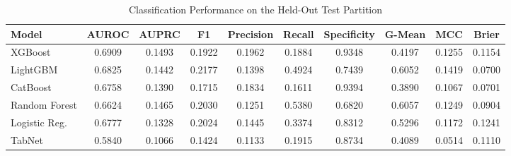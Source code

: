\begin{table}
\centering
\caption{Classification Performance on the Held-Out Test Partition}
\label{tab:results}
\begin{tabular}{lccccccccc}
\toprule
Model & AUROC & AUPRC & F1 & Precision & Recall & Specificity & G-Mean & MCC & Brier \\
\midrule
XGBoost & 0.6909 & 0.1493 & 0.1922 & 0.1962 & 0.1884 & 0.9348 & 0.4197 & 0.1255 & 0.1154 \\
LightGBM & 0.6825 & 0.1442 & 0.2177 & 0.1398 & 0.4924 & 0.7439 & 0.6052 & 0.1419 & 0.0700 \\
CatBoost & 0.6758 & 0.1390 & 0.1715 & 0.1834 & 0.1611 & 0.9394 & 0.3890 & 0.1067 & 0.0701 \\
Random Forest & 0.6624 & 0.1465 & 0.2030 & 0.1251 & 0.5380 & 0.6820 & 0.6057 & 0.1249 & 0.0904 \\
Logistic Reg. & 0.6777 & 0.1328 & 0.2024 & 0.1445 & 0.3374 & 0.8312 & 0.5296 & 0.1172 & 0.1241 \\
TabNet & 0.5840 & 0.1066 & 0.1424 & 0.1133 & 0.1915 & 0.8734 & 0.4089 & 0.0514 & 0.1110 \\
\bottomrule
\end{tabular}
\end{table}
